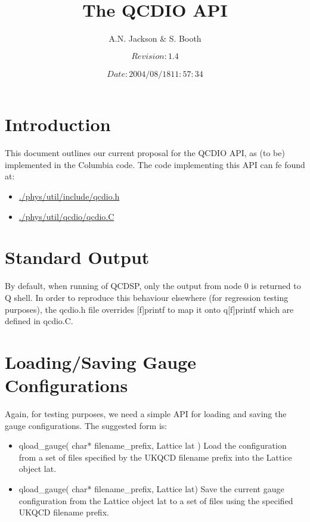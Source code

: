 \documentclass[12pt]{article}
\title{The QCDIO API}
\author{A.N. Jackson \& S. Booth}
\date{\mbox{\small $$Revision: 1.4 $$  $$Date: 2004/08/18 11:57:34 $$}}
\begin{document}
\maketitle

\tableofcontents
\newpage

\section{Introduction}
This document outlines our current proposal for the QCDIO API, as (to be)
implemented in the Columbia code.  The code implementing this API can fe found
at: 
\begin{itemize}
 \item
 \href{../doxygen/html/qcdio_h.html}{./phys/util/include/qcdio.h}
 \item
 \href{../doxygen/html/qcdio_C.html}{./phys/util/qcdio/qcdio.C}
\end{itemize}

\section{Standard Output}
By default, when running of QCDSP, only the output from node 0 is returned to
Q shell.  In order to reproduce this behaviour elsewhere (for regression testing
purposes), the qcdio.h file overrides [f]printf to map it onto q[f]printf
which are defined in qcdio.C.

\section{Loading/Saving Gauge Configurations}
Again, for testing purposes, we need a simple API for loading and saving the
gauge configurations.  The suggested form is:
\begin{itemize}
\item{qload\_gauge( char* filename\_prefix, Lattice lat )}
Load the configuration from a set of files specified by the UKQCD filename
prefix into the Lattice object lat.
\item{qload\_gauge( char* filename\_prefix, Lattice lat)}
Save the current gauge configuration from the Lattice object lat to a set of 
files using the specified UKQCD filename prefix.
\end{itemize}
\end{document}
